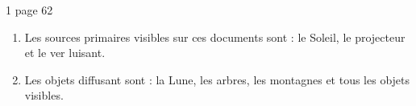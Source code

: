 \begin{myact}{1 page 62}
	\begin{enumerate}
		\item Les sources primaires visibles sur ces documents sont : le Soleil, le projecteur et le ver luisant.\pause
		\item Les objets diffusant sont : la Lune, les arbres, les montagnes et tous les objets visibles.
	\end{enumerate}
\end{myact}